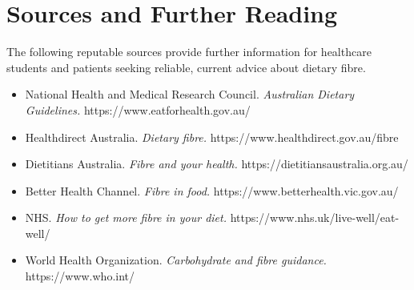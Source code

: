 \section*{Sources and Further Reading}
The following reputable sources provide further information for healthcare students and patients seeking reliable, current advice about dietary fibre.
\begin{itemize}
    \item National Health and Medical Research Council. \textit{Australian Dietary Guidelines.} https://www.eatforhealth.gov.au/
    \item Healthdirect Australia. \textit{Dietary fibre.} https://www.healthdirect.gov.au/fibre
    \item Dietitians Australia. \textit{Fibre and your health.} https://dietitiansaustralia.org.au/
    \item Better Health Channel. \textit{Fibre in food.} https://www.betterhealth.vic.gov.au/
    \item NHS. \textit{How to get more fibre in your diet.} https://www.nhs.uk/live-well/eat-well/
    \item World Health Organization. \textit{Carbohydrate and fibre guidance.} https://www.who.int/
\end{itemize}
